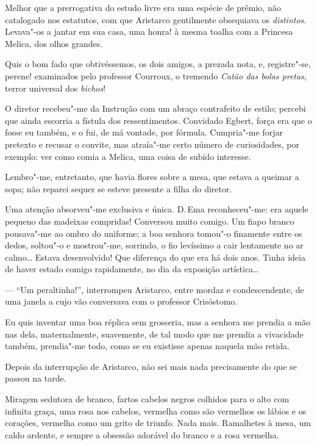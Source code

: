 Melhor que a prerrogativa do estudo livre
era uma espécie de prêmio, não catalogado nos estatutos, com que
Aristarco gentilmente obsequiava os \textit{distintos}. Levava"-os a jantar em
sua casa, uma honra! à mesma toalha com a Princesa Melica, dos olhos grandes. 

Quis o bom fado que obtivéssemos, os dois amigos, a prezada
nota, e, registre"-se, perene! examinados pelo professor Courroux, o
tremendo \textit{Catão das bolas pretas}, terror universal dos \textit{bichos}!

O diretor recebeu"-me da Instrução com um abraço contrafeito de estilo; percebi
que ainda escorria a fístula dos ressentimentos. Convidado Egbert,
força era que o fosse eu também, e o fui, de má vontade, por fórmula.
Cumpria"-me forjar pretexto e recusar o convite, mas atraía"-me certo
número de curiosidades, por exemplo: ver como comia a Melica, uma coisa
de subido interesse. 

Lembro"-me, entretanto, que havia flores sobre a
mesa, que estava a queimar a sopa; não reparei sequer se esteve presente 
a filha do diretor. 

Uma atenção absorveu"-me
exclusiva e única. D.\,Ema reconheceu"-me: era aquele pequeno das
madeixas compridas! Conversou muito comigo. Um fiapo branco
pousava"-me ao ombro do uniforme; a boa senhora tomou"-o finamente
entre os dedos, soltou"-o e mostrou"-me, sorrindo, o fio levíssimo a
cair lentamente no ar calmo\ldots{} Estava desenvolvido! Que diferença do
que era há dois anos. Tinha ideia de haver estado comigo rapidamente,
no dia da exposição artística\ldots{} 

--- ``Um peraltinha!'', interrompeu Aristarco, entre mordaz e condescendente, 
de uma janela a cujo vão
conversava com o professor Crisóstomo. 

Eu quis inventar uma boa réplica
sem grosseria, mas a senhora me prendia a mão nas dela, maternalmente,
suavemente, de tal modo que me prendia a vivacidade também,
prendia"-me todo, como se eu existisse apenas naquela mão retida.

Depois da interrupção de Aristarco, não sei mais nada precisamente do
que se passou na tarde. 

Miragem sedutora de branco, fartos cabelos
negros colhidos para o alto com infinita graça, uma rosa nos cabelos,
vermelha como são vermelhos os lábios e os corações, vermelha como um
grito de triunfo. Nada mais. Ramalhetes à mesa, um caldo ardente, e
sempre a obsessão adorável do branco e a rosa vermelha. 

